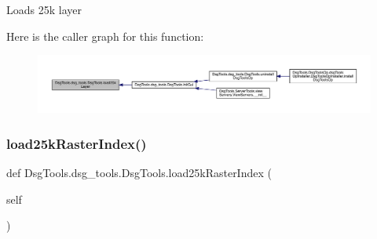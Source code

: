 \begin{DoxyVerb}Loads 25k layer
\end{DoxyVerb}
 Here is the caller graph for this function\+:
\nopagebreak
\begin{figure}[H]
\begin{center}
\leavevmode
\includegraphics[width=350pt]{class_dsg_tools_1_1dsg__tools_1_1_dsg_tools_adcbf7249e2335d38e00b491002cf0457_icgraph}
\end{center}
\end{figure}
\mbox{\label{class_dsg_tools_1_1dsg__tools_1_1_dsg_tools_a3fbcb16c1fa37133d89a1f916f254958}} 
\subsubsection{\texorpdfstring{load25k\+Raster\+Index()}{load25kRasterIndex()}}
{\footnotesize\ttfamily def Dsg\+Tools.\+dsg\+\_\+tools.\+Dsg\+Tools.\+load25k\+Raster\+Index (\begin{DoxyParamCaption}\item[{}]{self }\end{DoxyParamCaption})}

